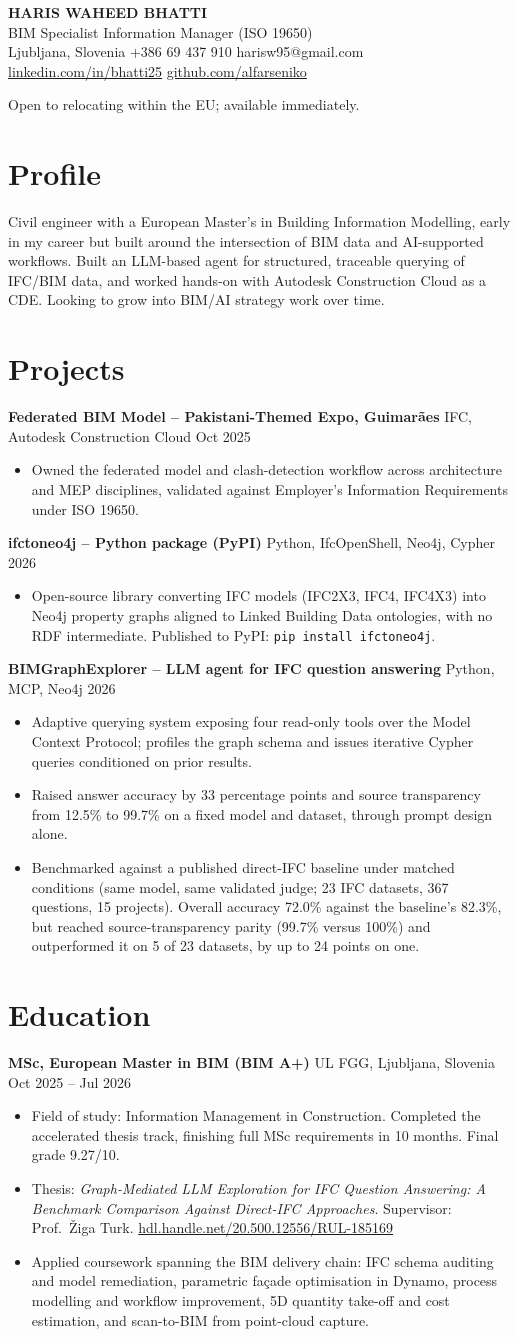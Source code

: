 \documentclass[a4paper,10.5pt]{article}
\newcommand{\datefill}{\dotfill}
\newcommand{\entry}[3]{\vspace{2.5pt}\noindent\textbf{#1} \textbar{} #2 \datefill{} #3\par\vspace{0.5pt}}
\newcommand{\ROLELINE}{BIM Specialist \textbar{} Information Manager (ISO 19650)}
\newcommand{\projIfcToNeo}{%
\entry{ifctoneo4j -- Python package (PyPI)}{Python, IfcOpenShell, Neo4j, Cypher}{2026}
\begin{itemize}
  \item Open-source library converting IFC models (IFC2X3, IFC4, IFC4X3) into Neo4j
        property graphs aligned to Linked Building Data ontologies, with no RDF
        intermediate. Published to PyPI: \texttt{pip install ifctoneo4j}.
\end{itemize}}
\newcommand{\projBIMGraph}{%
\entry{BIMGraphExplorer -- LLM agent for IFC question answering}{Python, MCP, Neo4j}{2026}
\begin{itemize}
  \item Adaptive querying system exposing four read-only tools over the Model
        Context Protocol; profiles the graph schema and issues iterative Cypher
        queries conditioned on prior results.
  \item Raised answer accuracy by 33 percentage points and source transparency from
        12.5\% to 99.7\% on a fixed model and dataset, through prompt design alone.
  \item Benchmarked against a published direct-IFC baseline under matched
        conditions (same model, same validated judge; 23 IFC datasets, 367
        questions, 15 projects). Overall accuracy 72.0\% against the baseline's
        82.3\%, but reached source-transparency parity (99.7\% versus 100\%) and
        outperformed it on 5 of 23 datasets, by up to 24 points on one.
\end{itemize}}
\newcommand{\projGuimaraes}{%
\entry{Federated BIM Model -- Pakistani-Themed Expo, Guimar\~aes}{IFC, Autodesk Construction Cloud}{Oct 2025}
\begin{itemize}
  \item Owned the federated model and clash-detection workflow across architecture
        and MEP disciplines, validated against Employer's Information Requirements
        under ISO 19650.
\end{itemize}}
\begin{document}
\begin{center}
  {\LARGE\bfseries HARIS WAHEED BHATTI}\\[2pt]
  {\large \ROLELINE}\\[3pt]
  Ljubljana, Slovenia \textbar{} +386 69 437 910 \textbar{} harisw95@gmail.com\\
  \href{https://linkedin.com/in/bhatti25}{linkedin.com/in/bhatti25} \textbar{}
  \href{https://github.com/alfarseniko}{github.com/alfarseniko}
\end{center}
\vspace{-4pt}
\noindent\small Open to relocating within the EU; available immediately.\normalsize

\section{Profile}

\noindent Civil engineer with a European Master's in Building Information Modelling,
early in my career but built around the intersection of BIM data and AI-supported
workflows. Built an LLM-based agent for structured, traceable querying of IFC/BIM
data, and worked hands-on with Autodesk Construction Cloud as a CDE. Looking to grow
into BIM/AI strategy work over time.

\section{Projects}

 \projGuimaraes \projIfcToNeo \projBIMGraph

\section{Education}
\entry{MSc, European Master in BIM (BIM A+)}{UL FGG, Ljubljana, Slovenia}{Oct 2025 -- Jul 2026}
\begin{itemize}
  \item Field of study: Information Management in Construction. Completed the
        accelerated thesis track, finishing full MSc requirements in 10 months.
        Final grade 9.27/10.
  \item Thesis: \textit{Graph-Mediated LLM Exploration for IFC Question Answering:
        A Benchmark Comparison Against Direct-IFC Approaches}. Supervisor:
        Prof.~\v{Z}iga Turk. \href{http://hdl.handle.net/20.500.12556/RUL-185169}{hdl.handle.net/20.500.12556/RUL-185169}
  \item Applied coursework spanning the BIM delivery chain: IFC schema auditing and model remediation, parametric façade optimisation in Dynamo, process modelling and workflow improvement, 5D quantity take-off and cost estimation, and scan-to-BIM from point-cloud capture.
\end{itemize}
\end{document}
